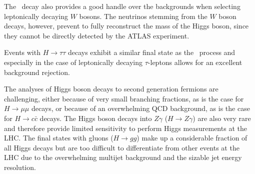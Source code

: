 The \HWW\ decay also provides a good handle over the backgrounds when selecting leptonically decaying $W$ bosons.
The neutrinos stemming from the $W$ boson decays, however, prevent to fully reconstruct the mass of the Higgs boson, since they cannot be directly detected by the ATLAS experiment.


Events with $H \to \tau\tau $ decays exhibit a similar final state as the \HWW\ process and especially in the case of leptonically decaying $\tau$-leptons allows for an excellent background rejection. 

The analyses of Higgs boson decays to second generation fermions are challenging, either because of very small branching fractions, as is the case for $H \to \mu\mu$ decays, or because of an overwhelming QCD background, as is the case for $H \to c\bar{c}$ decays.
The Higgs boson decays into $Z\gamma$ ($H \to Z\gamma$) are also very rare and therefore provide limited sensitivity to perform Higgs measurements at the LHC. 
The final states with gluons ($H \to gg$) make up a considerable fraction of all Higgs decays but are too difficult to differentiate from other events at the LHC due to the overwhelming multijet background and the sizable jet energy resolution. 


